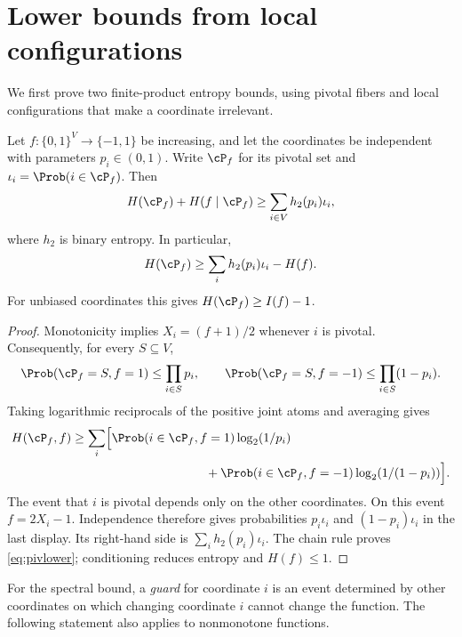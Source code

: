 \section{Lower bounds from local configurations}\label{sec:lower}

We first prove two finite-product entropy bounds, using pivotal fibers and local configurations that make a coordinate irrelevant.

\begin{theorem}\label{thm:pivlower}
Let $f:\{0,1\}^V\to\{-1,1\}$ be increasing, and let the coordinates be independent with parameters $p_i\in(0,1)$. Write $\cP_f$ for its pivotal set and $\iota_i=\Prob(i\in\cP_f)$. Then
\begin{equation}\label{eq:pivlower}
 H(\cP_f)+H(f\mid\cP_f)\ge\sum_{i\in V}h_2(p_i)\iota_i,
\end{equation}
where $h_2$ is binary entropy. In particular,
\[
 H(\cP_f)\ge\sum_i h_2(p_i)\iota_i-H(f).
\]
For unbiased coordinates this gives $H(\cP_f)\ge I(f)-1$.
\end{theorem}
\begin{proof}
Monotonicity implies $X_i=(f+1)/2$ whenever $i$ is pivotal. Consequently, for every $S\subseteq V$,
\[
 \Prob(\cP_f=S,f=1)\le\prod_{i\in S}p_i,
 \qquad
 \Prob(\cP_f=S,f=-1)\le\prod_{i\in S}(1-p_i).
\]
Taking logarithmic reciprocals of the positive joint atoms and averaging gives
\begin{align*}
 H(\cP_f,f)
 &\ge\sum_i\Bigl[\Prob(i\in\cP_f,f=1)\log_2(1/p_i)\\
 &\hspace{38mm}+\Prob(i\in\cP_f,f=-1)\log_2(1/(1-p_i))\Bigr].
\end{align*}
The event that $i$ is pivotal depends only on the other coordinates. On this event $f=2X_i-1$. Independence therefore gives probabilities $p_i\iota_i$ and $(1-p_i)\iota_i$ in the last display. Its right-hand side is $\sum_i h_2(p_i)\iota_i$. The chain rule proves \eqref{eq:pivlower}; conditioning reduces entropy and $H(f)\le1$.
\end{proof}

For the spectral bound, a \emph{guard} for coordinate $i$ is an event determined by other coordinates on which changing coordinate $i$ cannot change the function. The following statement also applies to nonmonotone functions.

